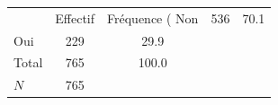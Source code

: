 {
\def\sym#1{\ifmmode^{#1}\else\(^{#1}\)\fi}
\begin{tabular}{l*{1}{cc}}
\toprule
            &    Effectif&Fréquence (%
\midrule
Non         &         536&        70.1\\
Oui         &         229&        29.9\\
Total       &         765&       100.0\\
\midrule
\(N\)       &         765&            \\
\bottomrule
\end{tabular}
}
